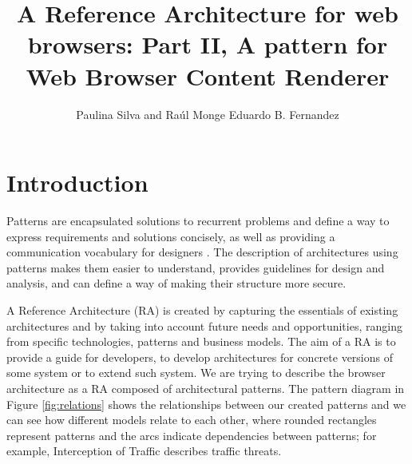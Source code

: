 \documentclass[]{acmlarge}
\title{A Reference Architecture for web browsers: Part II, A pattern for Web Browser Content Renderer}
\author{
Paulina Silva and Raúl Monge
  \affil{Universidad Técnica Federico Santa María}
Eduardo B. Fernandez
  \affil{Florida Atlantic University}
}
\begin{document}


 


\maketitle

\section{Introduction}
Patterns are encapsulated solutions to recurrent problems and define a way to express requirements and solutions concisely, as well as providing a communication vocabulary for designers \cite{gamma1994design,buschman1996system}. The description of architectures using patterns makes them easier to understand, provides guidelines for design and analysis, and can define a way of making their structure more secure.

A Reference Architecture (RA) is created by capturing the essentials of existing architectures and by taking into account future needs and opportunities, ranging from specific technologies, patterns and business models. The aim of a RA is to provide a guide for developers, %
to develop architectures for concrete versions of some system or to extend such system. We are trying to describe the browser architecture as a RA composed  of architectural patterns. The pattern diagram \cite{buschman1996system} in Figure \ref{fig:relations} shows the relationships between our created patterns and we can see how different models relate to each other, where rounded rectangles represent patterns and the arcs indicate dependencies between patterns; for example, Interception of Traffic describes traffic threats.
\end{document}
